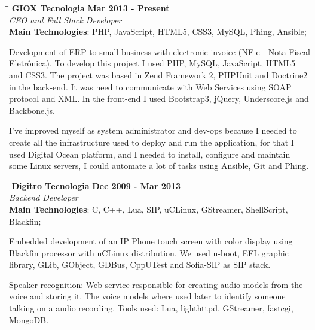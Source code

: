 \documentclass[margin]{res}
\begin{document}
\begin{resume}
\vspace{-0.1in}
    \begin{tabbing}
    \hspace{2.3in}\= \hspace{1.7in}\= \kill
    \textbf{GIOX Tecnologia}    \>\>\textbf{Mar 2013 - Present}\\
    \textit{CEO and Full Stack Developer}\\
    \textbf{Main Technologies}: PHP, JavaScript, HTML5, CSS3, MySQL, Phing, Ansible;
    \end{tabbing}\vspace{-20pt}
    \vspace{2mm}
Development of ERP to small business with electronic invoice (NF-e - Nota Fiscal Eletrônica). To develop this project I used PHP, MySQL, JavaScript, HTML5 and CSS3. The project was based in Zend Framework 2, PHPUnit and Doctrine2 in the back-end. It was need to communicate with Web Services using SOAP protocol and XML. In the front-end I used Bootstrap3, jQuery, Underscore.js and Backbone.js.

I've improved myself as system administrator and dev-ops because I needed to create all the infrastructure used to deploy and run the application, for that I used Digital Ocean platform, and I needed to install, configure and maintain some Linux servers, I could automate a lot of tasks using Ansible, Git and Phing.

\vspace{-0.1in}
    \begin{tabbing}
    \hspace{2.3in}\= \hspace{1.7in}\= \kill
    \textbf{Digitro Tecnologia}    \>\>\textbf{Dec 2009 - Mar 2013}\\
    \textit{Backend Developer}\\
    \textbf{Main Technologies}: C, C++, Lua, SIP, uCLinux, GStreamer, ShellScript, Blackfin;
    \end{tabbing}\vspace{-20pt}
    \vspace{2mm}
Embedded development of an IP Phone touch screen with color display using Blackfin processor with uCLinux distribution. We used u-boot, EFL graphic library, GLib, GObject, GDBus, CppUTest and Sofia-SIP as SIP stack.
    
Speaker recognition: Web service responsible for creating audio models from the voice and storing it. The voice models where used later to identify someone talking on a audio recording. Tools used: Lua, lighthttpd, GStreamer, fastcgi, MongoDB.


\end{resume}
\end{document}
